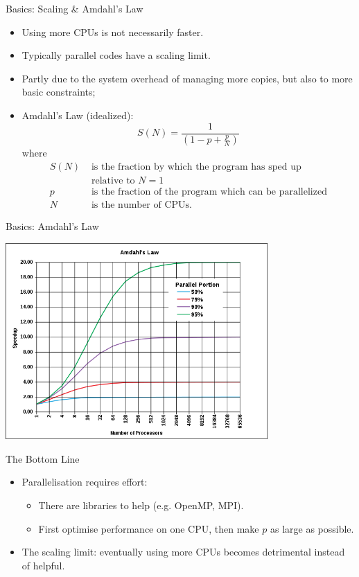 \begin{frame}{Basics: Scaling \& Amdahl's Law}
\begin{itemize}
\item{\alert{Using more CPUs is not necessarily faster.}}
  \pause
\item{Typically parallel codes have a \alert{scaling limit}.}
\item{Partly due to the system overhead of managing more copies, but also to more basic constraints;}
\pause
\item{Amdahl's Law (idealized):}
\[
S(N)=\frac{1}{\left(1-p+\frac{p}{N}\right)}
\]
where \begin{align*}S(N)&\text{ is the fraction by which the program has sped up}\\&\text{ relative to $N=1$}\\
p&\text{ is the fraction of the program which can be parallelized}\\
N&\text{ is the number of CPUs.}
\end{align*}
\end{itemize}
\end{frame}

\begin{frame}{Basics: Amdahl's Law}
\centerline{\includegraphics[width=0.75\textwidth]{imgs/AmdahlsLaw.png}}%
\smallskip
\end{frame}

\begin{frame}{The Bottom Line}
\begin{itemize}
\item{Parallelisation requires effort:}
\begin{itemize}
\item{There are libraries to help (e.g. \alert{OpenMP}, \alert{MPI}).}
\item{First optimise performance on one CPU, then make $p$ as large as possible.}
\end{itemize}
\pause
\item{The scaling limit: eventually using more CPUs becomes \alert{detrimental} instead of helpful.}
\end{itemize}
\end{frame}

